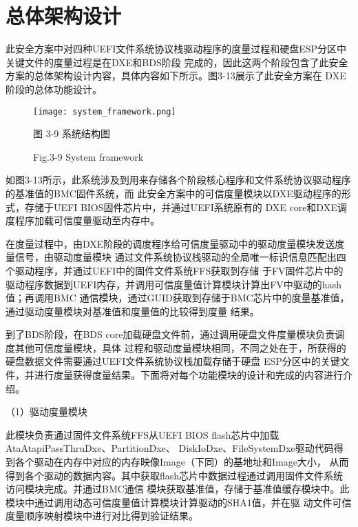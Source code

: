 %
%
\section{总体架构设计}
此安全方案中对四种UEFI文件系统协议栈驱动程序的度量过程和硬盘ESP分区中关键文件的度量过程是在DXE和BDS阶段
完成的，因此这两个阶段包含了此安全方案的总体架构设计内容，具体内容如下所示。图3-13展示了此安全方案在
DXE阶段的总体功能设计。

\begin{figure}[htb]
    \vspace{0cm}   
    \setlength{\abovecaptionskip}{0.3cm}
	\centering
    \texttt{[image: system\_framework.png]}
    \caption*{图 3-9 系统结构图}
    \setlength{\belowcaptionskip}{-0.5cm}
    \caption*{Fig.3-9 System framework}
\end{figure}

如图3-13所示，此系统涉及到用来存储各个阶段核心程序和文件系统协议驱动程序的基准值的BMC固件系统，而
此安全方案中的可信度量模块以DXE驱动程序的形式，存储于UEFI BIOS固件芯片中，并通过UEFI系统原有的
DXE core和DXE调度程序加载可信度量驱动至内存中。
\par 在度量过程中，由DXE阶段的调度程序给可信度量驱动中的驱动度量模块发送度量信号，由驱动度量模块
通过文件系统协议栈驱动的全局唯一标识信息匹配出四个驱动程序，并通过UEFI中的固件文件系统FFS获取到存储
于FV固件芯片中的驱动程序数据到UEFI内存，并调用可信度量值计算模块计算出FV中驱动的hash值；再调用BMC
通信模块，通过GUID获取到存储于BMC芯片中的度量基准值，通过驱动度量模块对基准值和度量值的比较得到度量
结果。
\par 到了BDS阶段，在BDS core加载硬盘文件前，通过调用硬盘文件度量模块负责调度其他可信度量模块，具体
过程和驱动度量模块相同，不同之处在于，所获得的硬盘数据文件需要通过UEFI文件系统协议栈加载存储于硬盘
ESP分区中的关键文件，并进行度量获得度量结果。下面将对每个功能模块的设计和完成的内容进行介绍。

\par （1）驱动度量模块
\par 此模块负责通过固件文件系统FFS从UEFI BIOS flash芯片中加载AtaAtapiPassThruDxe、PartitionDxe、
DiskIoDxe、FileSystemDxe驱动代码得到各个驱动在内存中对应的内存映像Image（下同）的基地址和Image大小，
从而得到各个驱动的数据内容。其中获取flash芯片中数据过程通过调用固件文件系统访问模块完成。并通过BMC通信
模块获取基准值，存储于基准值缓存模块中。此模块中通过调用动态可信度量值计算模块计算驱动的SHA1值，并在驱
动文件可信度量顺序映射模块中进行对比得到验证结果。

